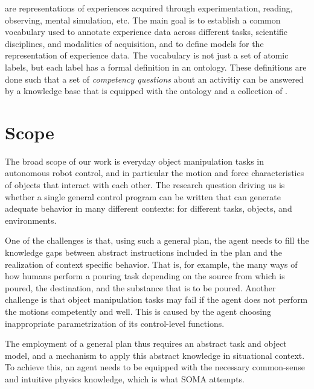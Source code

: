 
\neems are representations of experiences acquired through experimentation, reading, observing, mental simulation, etc.
The main goal is to establish a common vocabulary used to annotate experience data across different tasks, scientific disciplines, and modalities of acquisition, and to define models for the representation of experience data.
The vocabulary is not just a set of atomic labels, but each label has a formal definition in an ontology.
These definitions are done such that a set of \emph{competency questions} about an activitiy can be answered by a knowledge base that is equipped with the ontology and a collection of \neems.

\section{Scope} %
\label{sec:scope}

The broad scope of our work is everyday object manipulation tasks in autonomous robot control, and in particular the motion and force characteristics of objects that interact with each other.
The research question driving us is whether a single general control program can be written that can generate adequate behavior in many different contexts: for different tasks, objects, and environments.

One of the challenges is that, using such a general plan, the agent needs to fill the knowledge gaps between abstract instructions included in the plan and the realization of context specific behavior. That is, for example, the many ways of how humans perform a pouring task depending on the source from which is poured, the destination, and the substance that is to be poured.
Another challenge is that object manipulation tasks may fail if the agent does not perform the motions competently and well. This is caused by the agent choosing inappropriate parametrization of its control-level functions.

The employment of a general plan thus requires an abstract task and object model, and a mechanism to apply this abstract knowledge in situational context.
To achieve this, an agent needs to be equipped with the necessary common-sense and intuitive physics knowledge, which is what SOMA attempts.

